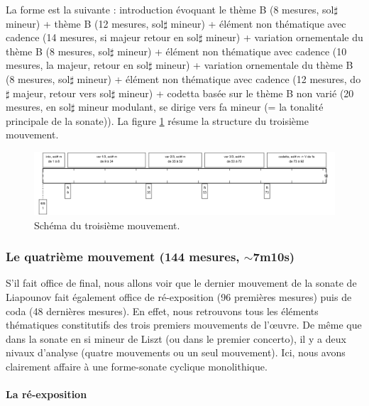 La forme est la suivante : introduction évoquant le thème B (8 mesures, sol$\sharp$ mineur) + thème B (12 mesures, sol$\sharp$ mineur) + élément non thématique avec cadence (14 mesures, si majeur retour en sol$\sharp$ mineur) + variation ornementale du thème B (8 mesures, sol$\sharp$ mineur) + élément non thématique avec cadence (10 mesures, la majeur, retour en sol$\sharp$ mineur) + variation ornementale du thème B (8 mesures, sol$\sharp$ mineur) + élément non thématique avec cadence (12 mesures, do$\sharp$ majeur, retour vers sol$\sharp$ mineur) + codetta basée sur le thème B non varié (20 mesures, en sol$\sharp$ mineur modulant, se dirige vers fa mineur (= la tonalité principale de la sonate)). La figure \ref{schema-3} résume la structure du troisième mouvement.

\begin{figure}[!ht]
  \begin{bigcenter}
    \includegraphics[width=17.5cm, keepaspectratio]{frise-mvt3.png}
  \end{bigcenter}
  \caption{\label{schema-3}Schéma du troisième mouvement.}
\end{figure}

\subsubsection*{Le quatrième mouvement (144 mesures, $\sim$7m10s)}

S'il fait office de final, nous allons voir que le dernier mouvement de la sonate de Liapounov fait également office de ré-exposition (96 premières mesures) puis de coda (48 dernières mesures). En effet, nous retrouvons tous les éléments thématiques constitutifs des trois premiers mouvements de l'œuvre. De même que dans la sonate en si mineur de Liszt (ou dans le premier concerto), il y a deux nivaux d'analyse (quatre mouvements ou un seul mouvement). Ici, nous avons clairement affaire à une forme-sonate cyclique monolithique.

\paragraph{La ré-exposition}

